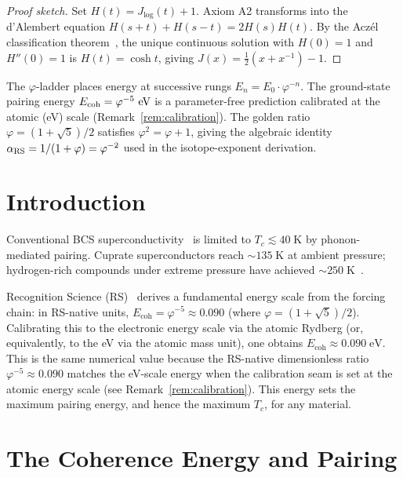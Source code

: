 \documentclass[12pt,a4paper]{article}
\theoremstyle{definition}
\theoremstyle{remark}
\begin{document}
\begin{proof}[Proof sketch]
Set $H(t) = J_{\log}(t)+1$.  Axiom A2 transforms into the d'Alembert
equation $H(s+t)+H(s-t)=2H(s)H(t)$.  By the Acz\'el classification
theorem~\cite{Aczel1966}, the unique continuous solution with $H(0)=1$
and $H''(0)=1$ is $H(t)=\cosh t$, giving
$J(x)=\tfrac{1}{2}(x+x^{-1})-1$.
\end{proof}

\noindent The $\varphi$-ladder places energy at successive rungs
$E_n = E_0 \cdot \varphi^{-n}$.  The ground-state pairing energy
$E_{\rm coh} = \varphi^{-5}~\text{eV}$ is a parameter-free prediction
calibrated at the atomic (eV) scale (Remark~\ref{rem:calibration}).
The golden ratio $\varphi=(1+\sqrt{5})/2$ satisfies $\varphi^2=\varphi+1$,
giving the algebraic identity $\alpha_{\rm RS}=1/(1+\varphi)=\varphi^{-2}$
used in the isotope-exponent derivation.

\section{Introduction}
\label{sec:intro}

Conventional BCS superconductivity~\cite{BCS1957} is limited to
$T_c \lesssim 40\;\mathrm{K}$ by phonon-mediated pairing.
Cuprate superconductors reach $\sim 135\;\mathrm{K}$ at ambient
pressure; hydrogen-rich compounds under extreme pressure have
achieved $\sim 250\;\mathrm{K}$~\cite{Drozdov2019}.

Recognition Science (RS)~\cite{RS_Axioms} derives a fundamental
energy scale from the forcing chain: in RS-native units,
$E_{\mathrm{coh}} = \varphi^{-5} \approx 0.090$
(where $\varphi = (1+\sqrt{5})/2$).  Calibrating this to the
electronic energy scale via the atomic Rydberg (or, equivalently,
to the eV via the atomic mass unit), one obtains
$E_{\mathrm{coh}} \approx 0.090\;\mathrm{eV}$.  This is the
same numerical value because the RS-native dimensionless ratio
$\varphi^{-5} \approx 0.090$ matches the eV-scale energy when
the calibration seam is set at the atomic energy scale (see
Remark~\ref{rem:calibration}).  This energy sets the maximum
pairing energy, and hence the maximum $T_c$, for any material.

\section{The Coherence Energy and Pairing}
\label{sec:pairing}
\end{document}
